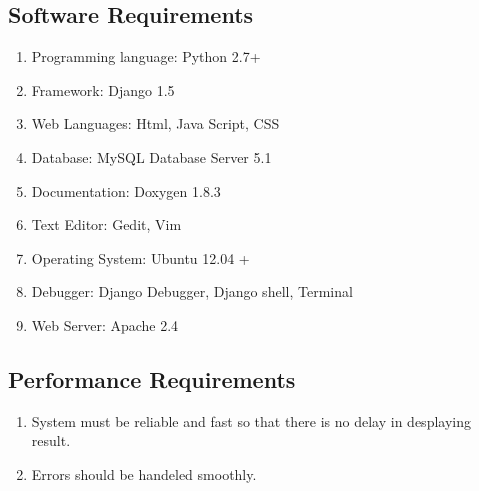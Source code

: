 \subsection{Software Requirements}
\begin{enumerate} 
    \item Programming language: Python 2.7+
    \item Framework: Django 1.5
    \item Web Languages: Html, Java Script, CSS 
    \item Database: MySQL Database Server 5.1 
    \item Documentation: Doxygen 1.8.3
    \item Text Editor: Gedit, Vim
    \item Operating System: Ubuntu 12.04 +
    \item Debugger: Django Debugger, Django shell, Terminal
    \item Web Server: Apache 2.4
\end{enumerate}
\subsection{Performance Requirements}
\begin{enumerate}
    \item System must be reliable and fast so that there is no delay in
        desplaying result.
    \item Errors should be handeled smoothly.
\end{enumerate}
